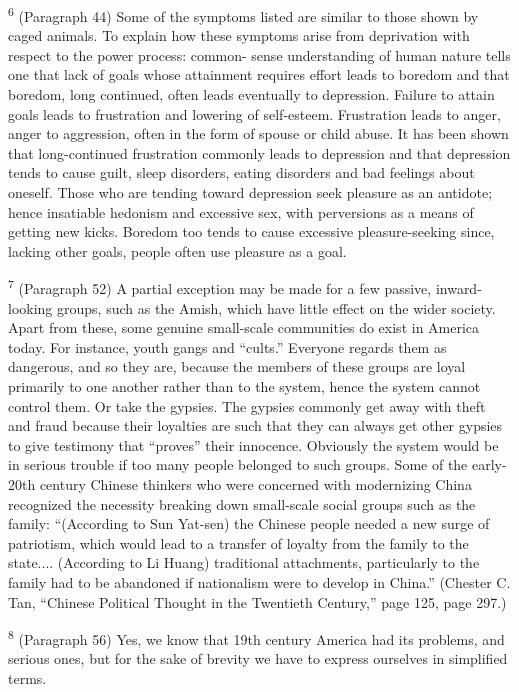 \documentclass{article}
\begin{document}
\textsuperscript{6} (Paragraph 44) Some of the symptoms listed are similar to those shown by caged animals. To 
explain how these symptoms arise from deprivation with respect to the power process: common-
sense understanding of human nature tells one that lack of goals whose attainment requires effort 
leads to boredom and that boredom, long continued, often leads eventually to 
depression. Failure to attain goals leads to frustration and lowering of self-esteem. Frustration 
leads to anger, anger to aggression, often in the form of spouse or child abuse. It has been shown 
that long-continued frustration commonly leads to depression and that depression tends to cause 
guilt, sleep disorders, eating disorders and bad feelings about oneself. Those who are tending 
toward depression seek pleasure as an antidote; hence insatiable hedonism and excessive sex, 
with perversions as a means of getting new kicks. Boredom too tends to cause excessive 
pleasure-seeking since, lacking other goals, people often use pleasure as a goal. \vspace{\baselineskip}

\textsuperscript{7} (Paragraph 52) A partial exception may be made for a few passive, inward-looking groups, such 
as the Amish, which have little effect on the wider society. Apart from these, some genuine 
small-scale communities do exist in America today. For instance, youth gangs and “cults.” 
Everyone regards them as dangerous, and so they are, because the members of these groups are 
loyal primarily to one another rather than to the system, hence the system cannot control 
them. Or take the gypsies. The gypsies commonly get away with theft and fraud because their 
loyalties are such that they can always get other gypsies to give testimony that “proves” their 
innocence. Obviously the system would be in serious trouble if too many people belonged to 
such groups. Some of the early-20th century Chinese thinkers who were concerned with 
modernizing China recognized the necessity breaking down small-scale social groups such as the 
family: “(According to Sun Yat-sen) the Chinese people needed a new surge of patriotism, which 
would lead to a transfer of loyalty from the family to the state.... (According to Li Huang) 
traditional attachments, particularly to the family had to be abandoned if nationalism were to 
develop in China.” (Chester C. Tan, “Chinese Political Thought in the Twentieth Century,” page 
125, page 297.) \vspace{\baselineskip}

\textsuperscript{8} (Paragraph 56) Yes, we know that 19th century America had its problems, and serious ones, but 
for the sake of brevity we have to express ourselves in simplified terms. \vspace{\baselineskip} \newpage
\end{document}
